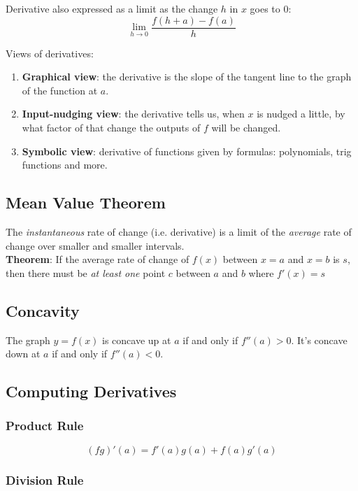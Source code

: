 \documentclass[12pt, a4paper]{scrartcl}
\begin{document}
Derivative also expressed as a limit as the change $h$ in $x$ goes to $0$: $$\lim_{h \to 0}\dfrac{f(h+a) - f(a)}{h}$$

Views of derivatives:
\begin{enumerate}
    \item \textbf{Graphical view}: the derivative is the slope of the tangent line to the graph of the function at $a$.
    \item \textbf{Input-nudging view}: the derivative tells us, when $x$ is nudged a little, by what factor of that change the outputs of $f$ will be changed.
    \item \textbf{Symbolic view}: derivative of functions given by formulas: polynomials, trig functions and more.
\end{enumerate}


\subsection{Mean Value Theorem}
\label{sec:derivatives:mvt}

The \textit{instantaneous} rate of change (i.e. derivative) is a limit of the \textit{average} rate of change over smaller and smaller intervals.\\
\textbf{Theorem}: If the average rate of change of $f(x)$ between $x = a$ and $x = b$ is $s$, then there must be \textit{at least one} point $c$ between $a$ and $b$ where $f'(x)=s$

\subsection{Concavity}
\label{sec:derivatives:concavity}

The graph $y = f(x)$ is concave up at $a$ if and only if  $f''(a) > 0$.	It's concave down at $a$ if and only if $f''(a) < 0$.

\subsection{Computing Derivatives}
\label{sec:derivatives:computing}

\subsubsection{Product Rule}
\label{sec:derivatives:computing:product}

$$(fg)'(a)=f'(a)g(a) + f(a)g'(a)$$

\subsubsection{Division Rule}
\label{sec:derivatives:computing:division}
\end{document}
